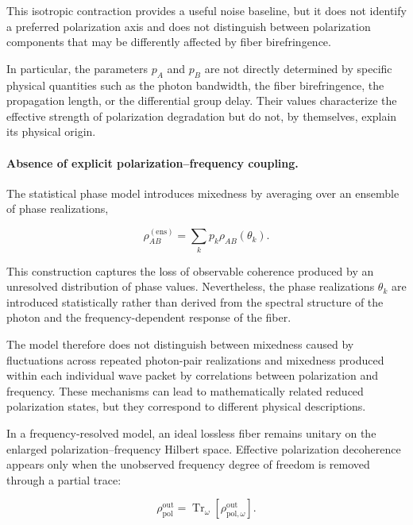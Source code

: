 This isotropic contraction provides a useful noise baseline, but it does not identify a preferred polarization axis and does not distinguish between polarization components that may be differently affected by fiber birefringence.

\medskip

In particular, the parameters \(p_A\) and \(p_B\) are not directly determined by specific physical quantities such as the photon bandwidth, the fiber birefringence, the propagation length, or the differential group delay. Their values characterize the effective strength of polarization degradation but do not, by themselves, explain its physical origin.

\medskip

\paragraph{Absence of explicit polarization--frequency coupling.}

The statistical phase model introduces mixedness by averaging over an ensemble of phase realizations,

\begin{equation}
\rho_{AB}^{(\mathrm{ens})}
=
\sum_k
p_k
\rho_{AB}(\theta_k).
\label{eq:phase_ensemble_limitation}
\end{equation}

This construction captures the loss of observable coherence produced by an unresolved distribution of phase values. Nevertheless, the phase realizations \( \theta_k \) are introduced statistically rather than derived from the spectral structure of the photon and the frequency-dependent response of the fiber.

\medskip

The model therefore does not distinguish between mixedness caused by fluctuations across repeated photon-pair realizations and mixedness produced within each individual wave packet by correlations between polarization and frequency. These mechanisms can lead to mathematically related reduced polarization states, but they correspond to different physical descriptions.

\medskip

In a frequency-resolved model, an ideal lossless fiber remains unitary on the enlarged polarization--frequency Hilbert space. Effective polarization decoherence appears only when the unobserved frequency degree of freedom is removed through a partial trace:

\begin{equation}
\rho_{\mathrm{pol}}^{\mathrm{out}}
=
\operatorname{Tr}_{\omega}
\left[
\rho_{\mathrm{pol},\omega}^{\mathrm{out}}
\right].
\label{eq:frequency_trace_limitation_ch5}
\end{equation}

